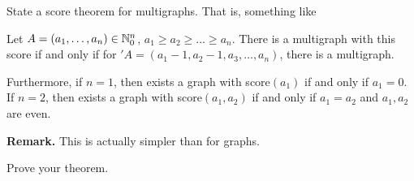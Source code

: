 
\begin{exercise}
  State a score theorem for multigraphs. That is, something like
  \begin{theorem}
     Let $A = (a_1,\dots,a_n) \in \mathbb{N}_0^n$, $a_1 \geq a_2 \geq \dots  \geq a_n$. There is a multigraph
     with this score if and only if for $\prime A = (a_1 - 1, a_2 - 1, a_3, \dots, a_n)$, there is a multigraph.

     Furthermore, if $n=1$, then exists a graph with score$(a_1)$ if and only if $a_1=0$.
     If $n=2$, then exists a graph with score$(a_1, a_2)$ if and only if $a_1=a_2$ and $a_1, a_2$ are even.
  \end{theorem}
  
  
  \textbf{Remark.} This is actually
  simpler than for graphs.
\end{exercise}

\begin{exercise}
  Prove your theorem.
\end{exercise}

